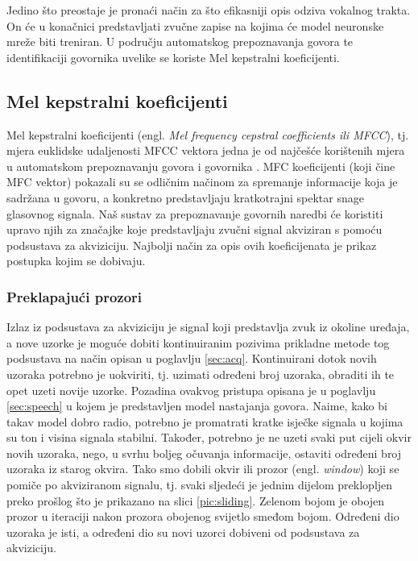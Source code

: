 Jedino što preostaje je pronaći način za što efikasniji opis odziva vokalnog trakta. On će
u konačnici predstavljati zvučne zapise na kojima će model neuronske mreže biti treniran.
U području automatskog prepoznavanja govora te identifikaciji govornika uvelike se koriste
Mel kepstralni koeficijenti.


\subsection{Mel kepstralni koeficijenti}
\label{MFCCconstruction}
Mel kepstralni koeficijenti (engl. \textit{Mel frequency cepstral coefficients ili MFCC}), tj. mjera 
euklidske udaljenosti MFCC vektora jedna je od najčešće korištenih mjera u automatskom 
prepoznavanju govora i govornika \cite{vasilijevic2011perceptual}. 
MFC koeficijenti (koji čine MFC vektor) pokazali su se odličnim načinom za spremanje informacije
koja je sadržana u govoru, a konkretno predstavljaju kratkotrajni spektar snage glasovnog 
signala. Naš sustav za prepoznavanje govornih naredbi će koristiti upravo njih za 
značajke koje predstavljaju zvučni signal akviziran s pomoću podsustava za akviziciju. 
Najbolji način za opis ovih koeficijenata je prikaz postupka kojim se dobivaju.


\subsubsection{Preklapajući prozori}
\label{sec:win}
Izlaz iz podsustava za akviziciju je signal koji predstavlja zvuk iz okoline uređaja, 
a nove uzorke je moguće dobiti kontinuiranim pozivima prikladne metode tog podsustava
na način opisan u poglavlju \ref{sec:acq}. Kontinuirani dotok novih uzoraka potrebno 
je uokviriti, tj. uzimati određeni broj uzoraka, obraditi ih te opet uzeti novije uzorke. 
Pozadina ovakvog pristupa opisana je u poglavlju \ref{sec:speech} u kojem je predstavljen
model nastajanja govora. Naime, kako bi takav model dobro radio, potrebno je promatrati
kratke isječke signala u kojima su ton i visina signala stabilni. Također, potrebno je
ne uzeti svaki put cijeli okvir novih uzoraka, nego, u svrhu boljeg očuvanja informacije,
ostaviti određeni broj uzoraka iz starog okvira. Tako smo dobili okvir ili 
prozor (engl. \textit{window})
koji se pomiče po akviziranom signalu, tj. svaki sljedeći je jednim dijelom preklopljen
preko prošlog što je prikazano na slici \ref{pic:sliding}. Zelenom bojom je obojen prozor
u iteraciji nakon prozora obojenog svijetlo smeđom bojom. Određeni dio uzoraka je isti,
a određeni dio su novi uzorci dobiveni od podsustava za akviziciju.

